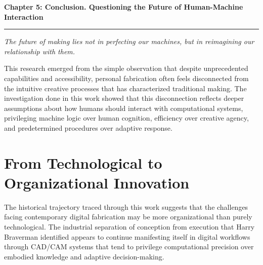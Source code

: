 \clearpage

\setcounter{chapter}{5}
\setcounter{section}{0}


\pagestyle{fancy}
\fancyhf{} %
\fancyfoot[C]{\thepage} %
\renewcommand{\headrulewidth}{0pt}
\renewcommand{\footrulewidth}{0pt}

\noindent
{\Large\textbf{Chapter 5: Conclusion. Questioning the Future of Human-Machine Interaction}}
\vspace{0.3cm}
\hrule
\vspace{0.8cm}
\label{ch:conclusions}

\setlength{\parindent}{0pt}

\textit{The future of making lies not in perfecting our machines, but in reimagining our relationship with them.}

\vspace{0.5cm}

This research emerged from the simple observation that despite unprecedented capabilities and accessibility, personal fabrication often feels disconnected from the intuitive creative processes that has characterized traditional making. The investigation done in this work showed that this disconnection reflects deeper assumptions about how humans should interact with computational systems, privileging machine logic over human cognition, efficiency over creative agency, and predetermined procedures over adaptive response.

\section{From Technological to Organizational Innovation}

The historical trajectory traced through this work suggests that the challenges facing contemporary digital fabrication may be more organizational than purely technological. The industrial separation of conception from execution that Harry Braverman identified appears to continue manifesting itself in digital workflows through CAD/CAM systems that tend to privilege computational precision over embodied knowledge and adaptive decision-making.


